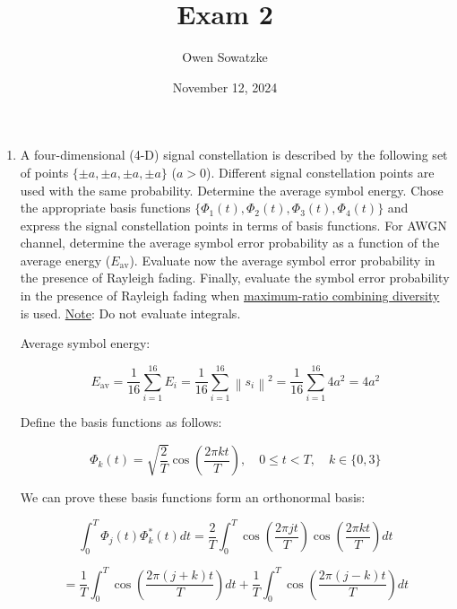 \documentclass[fleqn]{article}
\title{Exam 2}
\author{Owen Sowatzke}
\date{November 12, 2024}
\newcommand{\zerodisplayskip}{
	\setlength{\abovedisplayskip}{0pt}%
	\setlength{\belowdisplayskip}{0pt}%
	\setlength{\abovedisplayshortskip}{0pt}%
	\setlength{\belowdisplayshortskip}{0pt}%
	\setlength{\mathindent}{0pt}}
\newcommand{\norm}[1]{\left \lVert #1 \right \rVert}
\begin{document}
	\offinterlineskip
	\setlength{\lineskip}{12pt}
	\zerodisplayskip
	\maketitle
	
	\begin{enumerate}
		\item A four-dimensional (4-D) signal constellation is described by the following set of points $\{\pm a, \pm a, \pm a, \pm a\}$ ($a>0$). Different signal constellation points are used with the same probability. Determine the average symbol energy. Chose the appropriate basis functions $\{\Phi_1(t), \Phi_2(t), \Phi_3(t), \Phi_4(t)\}$ and express the signal constellation points in terms of basis functions. For AWGN channel, determine the average symbol error probability as a function of the average energy ($E_\text{av}$). Evaluate now the average symbol error probability in the presence of Rayleigh fading. Finally, evaluate the symbol error probability in the presence of Rayleigh fading when \underline{maximum-ratio combining diversity} is used. \underline{Note}: Do not evaluate integrals.

		Average symbol energy:
		
		\begin{equation*}
			E_\text{av} = \frac{1}{16}\sum_{i=1}^{16}{E_i} = \frac{1}{16}\sum_{i=1}^{16}{\norm{s_i}^2} = \frac{1}{16}\sum_{i=1}^{16}{4a^2} = 4a^2
		\end{equation*}
		
		Define the basis functions as follows:
		
		\begin{equation*}
			\Phi_k(t) = \sqrt{\frac{2}{T}}\cos\left(\frac{2{\pi}kt}{T}\right),\quad 0 \leq t < T,\quad k \in \{0,3\}
		\end{equation*}
		
		We can prove these basis functions form an orthonormal basis:
		
		\begin{equation*}
			\int_{0}^{T}{\Phi_j(t)\Phi_k^*(t)dt} = \frac{2}{T}\int_{0}^{T}{\cos\left(\frac{2{\pi}jt}{T}\right)\cos\left(\frac{2{\pi}kt}{T}\right)dt}
		\end{equation*}
		
		\begin{equation*}
			= \frac{1}{T}\int_{0}^{T}{\cos\left(\frac{2{\pi}(j+k)t}{T}\right)dt} + \frac{1}{T}\int_{0}^{T}{\cos\left(\frac{2{\pi}(j-k)t}{T}\right)dt}
		\end{equation*}
		

\end{enumerate}
\end{document}
